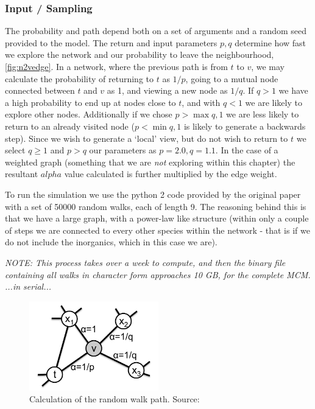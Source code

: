 \subsubsection{Input / Sampling}
The probability and path depend both on a set of arguments and a random seed provided to the model. The return and input parameters $p,q$ determine how fast we explore the network and our probability to leave the neighbourhood, \autoref{fig:n2vedge}. In a network, where the previous path is from $t$ to $v$, we may calculate the probability of returning to $t$ as $1/p$, going to a mutual node connected between $t$ and $v$ as 1, and viewing a new node as $1/q$.
If $q>1$ we have a high probability to end up at nodes close to $t$, and with $q<1$ we are likely to explore other nodes. Additionally if we chose $p> \max{q,1}$ we are less likely to return to an already visited node ($p < \min{q,1}$ is likely to generate a backwards step). Since we wish to generate a `local' view, but do not wish to return to $t$ we select  $q \ge 1$ and $p > q$ our parameters as  $p = 2.0,q=1.1$.  In the case of a weighted graph (something that we are \textit{not} exploring within this chapter) the resultant $alpha$ value calculated is further multiplied by the edge weight.

To run the simulation we use the python 2 code provided by the original paper \citep{node2vec} with a set of 50000 random walks, each of length 9. The reasoning behind this is that we have a large graph, with a power-law like structure (within only a couple of steps we are connected to every other species within the network - that is if we do not include the inorganics, which in this case we are).

\textit{NOTE: This process takes over a week to compute, and then the binary file containing all walks in character form approaches 10 GB, for the complete MCM. ...in serial... }

\begin{figure}[H]
  \centering
\includegraphics[width=0.5\textwidth]{4fig/n2vedge.png}
\caption{Calculation of the random walk path. Source:\citep{node2vec}}\label{fig:n2vedge}
\end{figure}


